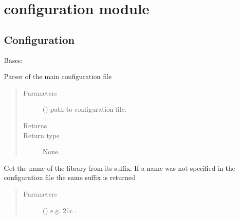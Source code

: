 \documentclass[letterpaper,10pt,english]{sphinxmanual}
\begin{document}
\section{configuration module}
\label{\detokenize{api/initobjects:configuration-module}}

\subsection{Configuration}
\label{\detokenize{api/initobjects:configuration}}\label{\detokenize{api/initobjects:confob}}

\begin{fulllineitems}
\label{\detokenize{api/initobjects:configuration.Configuration}}
Bases: 

Parser of the main configuration file
\begin{quote}\begin{description}
\item[{Parameters}] \leavevmode
{} () \textendash{} path to configuration file.

\item[{Returns}] \leavevmode


\item[{Return type}] \leavevmode
None.

\end{description}\end{quote}

\begin{fulllineitems}
\label{\detokenize{api/initobjects:configuration.Configuration.get_lib_name}}
Get the name of the library from its suffix. If a name was not
specified in the configuration file the same suffix is returned
\begin{quote}\begin{description}
\item[{Parameters}] \leavevmode
{} () \textendash{} e.g. 21c .


\end{description}
\end{quote}
\end{fulllineitems}
\end{fulllineitems}
\end{document}
